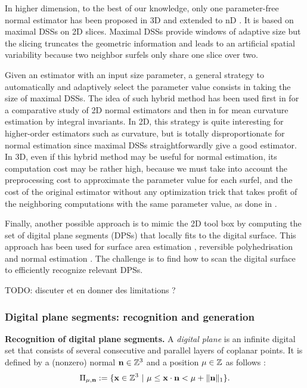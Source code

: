In higher dimension, to the best of our knowledge, only one parameter-free normal estimator
has been proposed in 3D \cite{Lenoir1996,Tellier1999} and extended to nD \cite{Lachaud2003}.
It is based on maximal DSSs on 2D slices. Maximal DSSs provide windows of adaptive size
but the slicing truncates the geometric information and leads to
an artificial spatial variability because two neighbor surfels only
share one slice over two. 

Given an estimator with an input size parameter, a general strategy to automatically and adaptively select
the parameter value consists in taking the size of maximal DSSs. 
The idea of such hybrid method has been used first in \cite{Devieilleville2009}
for a comparative study of 2D normal estimators and then in \cite{Coeurjolly2014IIfree}
for mean curvature estimation by integral invariants.
In 2D, this strategy is quite interesting for higher-order estimators such as curvature,
but is totally disproportionate for normal estimation since maximal DSSs straightforwardly give a good estimator. 
In 3D, even if this hybrid method may be useful for normal estimation, its computation cost may be rather high,
because we must take into account the preprocessing cost to approximate the parameter value for each surfel,
and the cost of the original estimator without any optimization trick that takes profit of the neighboring
computations with the same parameter value, as done in \cite{Lachaud2017}. 

Finally, another possible approach is to mimic the 2D tool box by computing the set of
digital plane segments (DPSs) that locally fits to the digital surface. This approach
has been used for surface area estimation \cite{Klette2001}, reversible polyhedrisation
\cite{Sivignon2004} and normal estimation \cite{Charrier2011}.
The challenge is to find how to scan the digital surface to efficiently recognize relevant DPSs. 

TODO: discuter \cite{Charrier2011} et en donner des limitations ?

\subsubsection{Digital plane segments: recognition and generation}
\label{sec:dps}

\noindent\textbf{Recognition of digital plane segments.}
A \emph{digital plane} is an infinite digital set that 
consists of several consecutive and parallel layers of coplanar points. 
It is defined by a (nonzero) normal $\mathbf{n} \in {\ensuremath\mathbb{Z}}^3$ and a position $\mu \in {\ensuremath\mathbb{Z}}$ as follows
\cite{reveilles1991}:  
\begin{equation}
  \label{eq:plane}
\Pi_{\mu,\mathbf{n}} := \{ \mathbf{x} \in {\ensuremath\mathbb{Z}}^3 \ | \ \mu \leq \mathbf{x} \cdot \mathbf{n} < \mu + \|\mathbf{n}\|_1 \}.
\end{equation}

